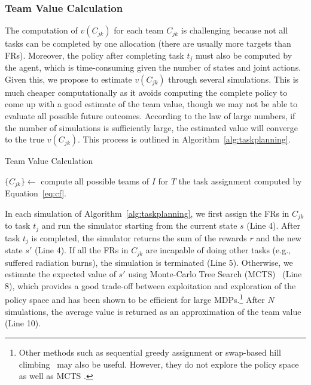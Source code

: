 \subsubsection{Team Value Calculation}
\noindent The computation of $v(C_{jk})$ for each team $C_{jk}$ is
challenging because not all tasks can be completed by one allocation
(there are usually more targets than FRs). Moreover, the policy
after completing task $t_j$ must also be computed by the agent, which
is time-consuming given the number of states and joint actions. Given
this, we propose to estimate $v(C_{jk})$ through several
simulations. This is much cheaper computationally as it avoids
computing the complete policy to come up with a good estimate of the
team value, though we may not be able to evaluate all possible future
outcomes. According to the law of large numbers, if the number of
simulations is sufficiently large, the estimated value will converge
to the true $v(C_{jk})$.  This process is outlined in
Algorithm~\ref{alg:taskplanning}.
\begin{algorithm}[htbp]
  \caption{Team Value Calculation}
  \label{alg:taskplanning}
  \Indm
  \Indp\BlankLine
  $\{ C_{jk} \} \gets$ compute all possible teams of $I$ for
  $T$ \;
  \Return the task assignment computed by Equation~\ref{eq:cf}.
\end{algorithm}

In each simulation of Algorithm~\ref{alg:taskplanning}, we first
assign the FRs in $C_{jk}$ to task $t_j$ and run the
simulator starting from the current state $s$ (Line 4). After task
$t_j$ is completed, the simulator returns the sum of the rewards
$r$ and the new state $s'$ (Line 4). If all the FRs in
$C_{jk}$ are incapable of doing other tasks (e.g., suffered
radiation burns), the simulation is terminated (Line
5). Otherwise, we estimate the expected value of $s'$ using
Monte-Carlo Tree Search (MCTS)~\cite{kocsis2006bandit} (Line 8),
which provides a good trade-off between exploitation and exploration
of the policy space and has been shown to be efficient for large
MDPs.\footnote{Other methods such as sequential greedy assignment
or swap-based hill climbing~\cite{proper2009solving} may also be useful. However, they do not explore the policy space as well as MCTS \cite{kocsis2006bandit}.} After $N$ simulations, the average value is returned as an approximation of
the team value (Line 10).


